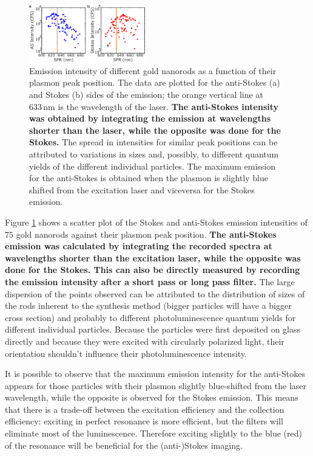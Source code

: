 \documentclass[journal=nalefd,manuscript=letter]{achemso}
\newcommand{\nm}{\ensuremath{\,\textrm{nm}}}
\begin{document}
\begin{figure}[htp] \centering
\includegraphics[width=0.45\textwidth]{Figures/03_Intensity_SPR/Intensity_SPR.png}
\caption{Emission intensity of different gold nanorods as a function of their
plasmon peak position. The data are plotted for the anti-Stokes (a) and Stokes
(b) sides of the emission; the orange vertical line at $633\nm$ is the
wavelength of the laser. \textbf{The anti-Stokes intensity was obtained by
integrating the emission at wavelengths shorter than the laser, while the
opposite was done for the Stokes.} The spread in intensities for similar peak
positions can be attributed to variations in sizes and, possibly, to different
quantum yields of the different individual particles. The maximum emission for
the anti-Stokes is obtained when the plasmon is slightly blue shifted from the
excitation laser and viceversa for the Stokes emission.}
	\label{fig:emission_peak_position}
\end{figure} 

Figure \ref{fig:emission_peak_position} shows a scatter plot of the Stokes and
anti-Stokes emission intensities of $75$ gold nanorods against their plasmon
peak position. \textbf{The anti-Stokes emission was calculated by integrating
the recorded spectra at wavelengths shorter than the excitation laser, while the
opposite was done for the Stokes. This can also be directly measured by
recording the emission intensity after a short pass or long pass filter.} The
large dispersion of the points observed can be attributed to the distribution of
sizes of the rods inherent to the synthesis method\cite{Zijlstra2011} (bigger
particles will have a bigger cross section) and probably to different
photoluminescence quantum yields for different individual particles. Because the
particles were first deposited on glass directly and because they were excited
with circularly polarized light, their orientation shouldn't influence their
photoluminescence intensity.

It is possible to observe that the maximum emission intensity for the
anti-Stokes appears for those particles with their plasmon slightly blue-shifted
from the laser wavelength, while the opposite is observed for the Stokes
emission. This means that there is a trade-off between the excitation efficiency
and the collection efficiency: exciting in perfect resonance is more efficient,
but the filters will eliminate most of the luminescence. Therefore exciting
slightly to the blue (red) of the resonance will be beneficial for the
(anti-)Stokes imaging. 
\end{document}
